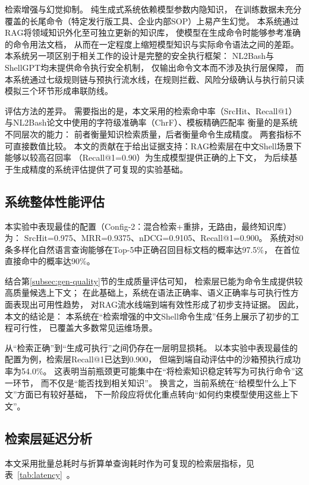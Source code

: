 检索增强与幻觉抑制。
纯生成式系统依赖模型参数内隐知识，
在训练数据未充分覆盖的长尾命令（特定发行版工具、企业内部SOP）上易产生幻觉。
本系统通过RAG将领域知识外化至可独立更新的知识库，
使模型在生成命令时能够参考准确的命令用法文档，
从而在一定程度上缩短模型知识与实际命令语法之间的差距。
本系统另一项区别于相关工作的设计是完整的安全执行框架：
NL2Bash与ShellGPT均未提供命令执行安全机制，
仅输出命令文本而不涉及执行层保障，
而本系统通过七级规则链与预执行流水线，在规则拦截、风险分级确认与执行前只读模拟三个环节形成串联防线。

评估方法的差异。
需要指出的是，本文采用的检索命中率（SrcHit、Recall@1）
与NL2Bash论文中使用的字符级准确率（ChrF）、模板精确匹配率
衡量的是系统不同层次的能力：
前者衡量知识检索质量，后者衡量命令生成精度。
两套指标不可直接数值比较。
本文的贡献在于给出证据支持：RAG检索层在中文Shell场景下能够以较高召回率
（Recall@1=0.90）为生成模型提供正确的上下文，
为后续基于生成精度的系统评估提供了可复现的实验基础。

\subsection{系统整体性能评估}

本实验中表现最佳的配置（Config-2：混合检索+重排，无路由，最终知识库）为：
SrcHit=0.975、MRR=0.9375、nDCG=0.9105、Recall@1=0.900。
系统对80条多样化自然语言查询能够在Top-5中正确召回目标文档的概率达97.5\%，
在首位直接命中的概率达90\%。

结合第\ref{subsec:gen-quality}节的生成质量评估可知，
检索层已能为命令生成提供较高质量候选上下文；
在此基础上，系统在语法正确率、语义正确率与可执行性方面表现出可用性趋势，
对RAG流水线端到端有效性形成了初步支持证据。
因此，本文的结论是：
本系统在“检索增强的中文Shell命令生成”任务上展示了初步的工程可行性，
已覆盖大多数常见运维场景。

从``检索正确''到``生成可执行''之间仍存在一层明显损耗。
以本实验中表现最佳的配置为例，检索层Recall@1已达到0.900，
但端到端自动评估中的沙箱预执行成功率为54.0\%。
这表明当前瓶颈更可能集中在``将检索知识稳定转写为可执行命令''这一环节，
而不仅是``能否找到相关知识''。
换言之，当前系统在``给模型什么上下文''方面已有较好基础，
下一阶段应将优化重点转向``如何约束模型使用这些上下文''。


\subsection{检索层延迟分析}

本文采用批量总耗时与折算单查询耗时作为可复现的检索层指标，见表~\ref{tab:latency}~。

